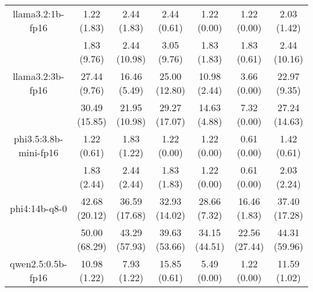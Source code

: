 \begin{table}[]
{\begin{tabular}{ccccccc}
        \multicolumn{1}{c|}{llama3.2:1b-fp16} & 1.22 (1.83) & 2.44 (1.83) & \multicolumn{1}{c|}{2.44 (0.61)} & 1.22 (0.00) & \multicolumn{1}{c|}{1.22 (0.00)} & 2.03 (1.42) \\
        
        

        \multicolumn{1}{c|}{} & 1.83 (9.76) & 2.44 (10.98) & \multicolumn{1}{c|}{3.05 (9.76)} & 1.83 (1.83) & \multicolumn{1}{c|}{1.83 (0.61)} & 2.44 (10.16) \\
        \cline{1-7}
        

        \multicolumn{1}{c|}{llama3.2:3b-fp16} & 27.44 (9.76) & 16.46 (5.49) & \multicolumn{1}{c|}{25.00 (12.80)} & 10.98 (2.44) & \multicolumn{1}{c|}{3.66 (0.00)} & 22.97 (9.35) \\
        
        

        \multicolumn{1}{c|}{} & 30.49 (15.85) & 21.95 (10.98) & \multicolumn{1}{c|}{29.27 (17.07)} & 14.63 (4.88) & \multicolumn{1}{c|}{7.32 (0.00)} & 27.24 (14.63) \\
        \cline{1-7}
        

        \multicolumn{1}{c|}{phi3.5:3.8b-mini-fp16} & 1.22 (0.61) & 1.83 (1.22) & \multicolumn{1}{c|}{1.22 (0.00)} & 1.22 (0.00) & \multicolumn{1}{c|}{0.61 (0.00)} & 1.42 (0.61) \\
        
        

        \multicolumn{1}{c|}{} & 1.83 (2.44) & 2.44 (2.44) & \multicolumn{1}{c|}{1.83 (1.83)} & 1.22 (0.00) & \multicolumn{1}{c|}{0.61 (0.00)} & 2.03 (2.24) \\
        \cline{1-7}
        

        \multicolumn{1}{c|}{phi4:14b-q8-0} & 42.68 (20.12) & 36.59 (17.68) & \multicolumn{1}{c|}{32.93 (14.02)} & 28.66 (7.32) & \multicolumn{1}{c|}{16.46 (1.83)} & 37.40 (17.28) \\
        
        

        \multicolumn{1}{c|}{} & 50.00 (68.29) & 43.29 (57.93) & \multicolumn{1}{c|}{39.63 (53.66)} & 34.15 (44.51) & \multicolumn{1}{c|}{22.56 (27.44)} & 44.31 (59.96) \\
        \cline{1-7}
        

        \multicolumn{1}{c|}{qwen2.5:0.5b-fp16} & 10.98 (1.22) & 7.93 (1.22) & \multicolumn{1}{c|}{15.85 (0.61)} & 5.49 (0.00) & \multicolumn{1}{c|}{1.22 (0.00)} & 11.59 (1.02) \\
        

\end{tabular}}
\end{table}
